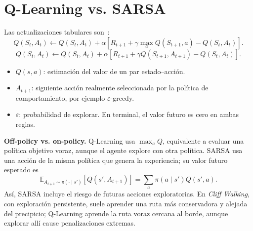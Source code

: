 \section{Q-Learning vs. SARSA}
Las actualizaciones tabulares son~\cite[seccs.~6.4--6.5]{sutton}:
\begin{equation}\label{eq:q-learning}
    Q(S_t,A_t)\leftarrow Q(S_t,A_t)+\alpha\left[
    R_{t+1}+\gamma\max_a Q(S_{t+1},a)-Q(S_t,A_t)\right].
\end{equation}
\begin{equation}\label{eq:sarsa}
    Q(S_t,A_t)\leftarrow Q(S_t,A_t)+\alpha\left[
    R_{t+1}+\gamma Q(S_{t+1},A_{t+1})-Q(S_t,A_t)\right].
\end{equation}
\begin{itemize}
    \item $Q(s,a)$: estimación del valor de un par estado--acción.
    \item $A_{t+1}$: siguiente acción realmente seleccionada por la política de comportamiento, por ejemplo $\varepsilon$-greedy.
    \item $\varepsilon$: probabilidad de explorar. En terminal, el valor futuro es cero en ambas reglas.
\end{itemize}

\textbf{Off-policy vs. on-policy.} Q-Learning usa $\max_a Q$, equivalente a evaluar una política objetivo voraz, aunque el agente explore con otra política. SARSA usa una acción de la misma política que genera la experiencia; su valor futuro esperado es
\begin{equation}\label{eq:sarsa-expectation}
    \mathbb{E}_{A_{t+1}\sim\pi(\cdot\mid s')}
    [Q(s',A_{t+1})]=\sum_a\pi(a\mid s')Q(s',a).
\end{equation}
Así, SARSA incluye el riesgo de futuras acciones exploratorias. En \textit{Cliff Walking}, con exploración persistente, suele aprender una ruta más conservadora y alejada del precipicio; Q-Learning aprende la ruta voraz cercana al borde, aunque explorar allí cause penalizaciones extremas.
